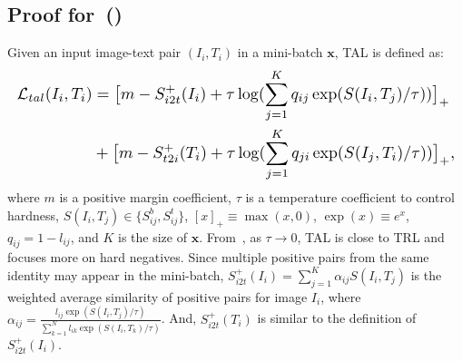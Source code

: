\documentclass[10pt,twocolumn,letterpaper]{article}
\begin{document}
\subsection{Proof for~()}
Given an input image-text pair $(I_i,T_i)$ in a mini-batch $\mathbf{x}$, TAL is defined as:
\begin{equation}
 \resizebox{\linewidth}{!}{$
    \begin{aligned}
        \mathcal{L}_{tal}(I_i,T_i)&=\big[ m -  S^+_{i2t}(I_i) + \tau \log ( \sum_{j = 1}^K q_{ij}\exp(S(I_i,T_j)/\tau)  ) \big]_+\\ &+\big[ m -  S^+_{t2i}(T_i)  + \tau \log ( \sum_{j = 1}^K q_{ji}\exp(S(I_j,T_i)/\tau)  ) \big]_+,
    \end{aligned}$}
    \label{eqtal}
\end{equation}
where $m$ is a positive margin coefficient, $\tau$ is a temperature coefficient to control hardness, $S(I_i,T_j)\in \{S_{ij}^b, S_{ij}^t\}$, $[x]_+ \equiv \max (x,0)$, $\exp(x)\equiv e^x$, $q_{ij}=1-l_{ij}$,  and $K$ is the size of $\mathbf{x}$. From~, as $\tau\to0$, TAL is close to TRL and focuses more on hard negatives.  Since multiple positive pairs from the same identity may appear in the mini-batch, $S^+_{i2t}(I_i) =\sum^K_{j=1} \alpha_{ij}  S(I_i,T_j)$ is the weighted average similarity of positive pairs for image $I_i$, where $\alpha_{ij}=\frac{l_{ij}\exp{(S(I_i,T_j)/\tau)}}{\sum^N_{k=1}l_{ik}\exp{(S(I_i,T_k)/\tau)}}$. And, $S^+_{i2t}(T_i)$ is similar to the definition of $S^+_{i2t}(I_i)$.  
\end{document}
